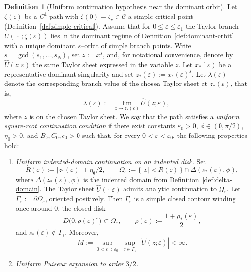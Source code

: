 \documentclass[11pt]{amsart}
\numberwithin{equation}{section}
\theoremstyle{plain}
\theoremstyle{definition}
\newtheorem{definition}[theorem]{Definition}
\theoremstyle{remark}
\begin{document}
\begin{definition}[Uniform continuation hypothesis near the dominant orbit]\label{def:uniform-delta}
	Let $\zeta(\varepsilon)$ be a $C^1$ path with $\zeta(0)=\zeta_c\in\mathcal C$ a simple critical point
	(Definition~\ref{def:simple-critical}). Assume that for $0\le\varepsilon\le\varepsilon_1$ the Taylor branch
	$U(\,\cdot\,;\zeta(\varepsilon))$ lies in the dominant regime of Definition~\ref{def:dominant-orbit} with a unique
	dominant $s$--orbit of simple branch points.
	Write $s=\gcd(s_1,\dots,s_N)$, set $z:=x^{s}$, and, for notational convenience, denote by
	$\widehat U(z;\varepsilon)$ the same Taylor sheet expressed in the variable $z$.
	Let $x_*(\varepsilon)$ be a representative dominant singularity and set $z_*(\varepsilon):=x_*(\varepsilon)^s$.
	Let $\lambda(\varepsilon)$ denote the corresponding branch value of the chosen Taylor sheet at $z_*(\varepsilon)$, that is,
	\[
		\lambda(\varepsilon):=
		\lim_{z\to z_*(\varepsilon)}\widehat U(z;\varepsilon),
	\]
	where $z$ is on the chosen Taylor sheet.
	We say that the path satisfies a \emph{uniform square-root continuation
condition} if there exist constants \(\varepsilon_0>0\),
\(\phi\in(0,\pi/2)\), \(\eta_0>0\), and \(B_0,C_0,c_0>0\) such that, for every
\(0<\varepsilon<\varepsilon_0\), the following properties hold:
	\begin{enumerate}[label=(U\arabic*),leftmargin=2.5em]
		    \item\label{U1} \emph{Uniform indented-domain continuation on an indented disk.}
		      Set
		      \[
			      R(\varepsilon):=|z_*(\varepsilon)|+\eta_0/2,
			      \qquad
			      \Omega_\varepsilon:=\{\,|z|<R(\varepsilon)\,\}\cap \Delta(z_*(\varepsilon),\phi),
		      \]
			    where \(\Delta(z_*(\varepsilon),\phi)\) is the indented domain from
		      Definition~\ref{def:delta-domain}. The Taylor sheet
		      \(\widehat U(\cdot;\varepsilon)\) admits analytic continuation to
		      \(\Omega_\varepsilon\). Let \(\Gamma_\varepsilon:=\partial\Omega_\varepsilon\),
		      oriented positively. Then \(\Gamma_\varepsilon\) is a simple closed contour
		      winding once around \(0\), the closed disk
		      \[
			      \overline{D\bigl(0,\rho(\varepsilon)^s\bigr)}
			      \subset \Omega_\varepsilon,
			      \qquad
			      \rho(\varepsilon):=\frac{1+\rho_*(\varepsilon)}{2},
		      \]
			  and \(z_*(\varepsilon)\notin \Gamma_\varepsilon\).
		      Moreover,
		      \[
			      M:=\sup_{0<\varepsilon<\varepsilon_0}\ \sup_{z\in\Gamma_\varepsilon}\ |\widehat U(z;\varepsilon)|<\infty.
		      \]
		\item\label{U2} \emph{Uniform Puiseux expansion to order $3/2$.}

\end{enumerate}
\end{definition}
\end{document}
